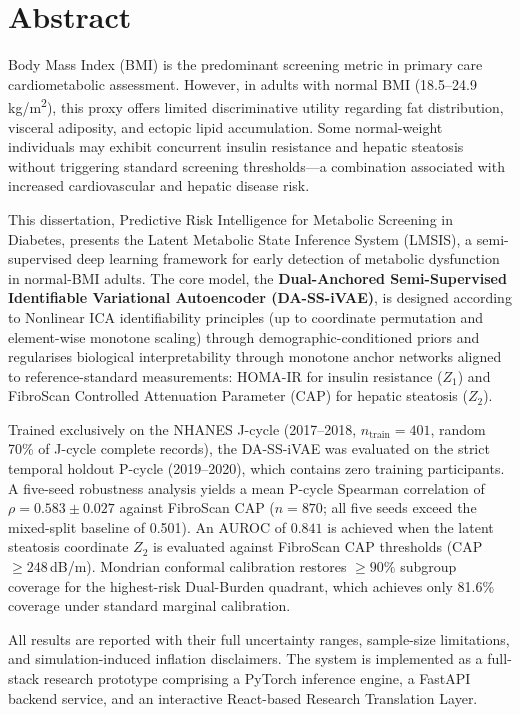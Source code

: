 \documentclass[12pt,a4paper,oneside]{report}
\newcommand{\daivae}{DA-SS-iVAE}
\begin{document}
\chapter*{Abstract}

Body Mass Index (BMI) is the predominant screening metric in primary care cardiometabolic assessment. However, in adults with normal BMI (18.5--24.9\,kg/m\textsuperscript{2}), this proxy offers limited discriminative utility regarding fat distribution, visceral adiposity, and ectopic lipid accumulation. Some normal-weight individuals may exhibit concurrent insulin resistance and hepatic steatosis without triggering standard screening thresholds---a combination associated with increased cardiovascular and hepatic disease risk.

This dissertation, Predictive Risk Intelligence for Metabolic Screening in Diabetes, presents the Latent Metabolic State Inference System (LMSIS), a semi-supervised deep learning framework for early detection of metabolic dysfunction in normal-BMI adults. The core model, the \textbf{Dual-Anchored Semi-Supervised Identifiable Variational Autoencoder (\daivae{})}, is designed according to Nonlinear ICA identifiability principles (up to coordinate permutation and element-wise monotone scaling) through demographic-conditioned priors and regularises biological interpretability through monotone anchor networks aligned to reference-standard measurements: HOMA-IR for insulin resistance ($Z_1$) and FibroScan Controlled Attenuation Parameter (CAP) for hepatic steatosis ($Z_2$).

Trained exclusively on the NHANES J-cycle (2017--2018, $n_{\text{train}} = 401$, random 70\% of J-cycle complete records), the DA-SS-iVAE was evaluated on the strict temporal holdout P-cycle (2019--2020), which contains zero training participants. A five-seed robustness analysis yields a mean P-cycle Spearman correlation of $\rho = 0.583 \pm 0.027$ against FibroScan CAP ($n = 870$; all five seeds exceed the mixed-split baseline of 0.501). An AUROC of $0.841$ is achieved when the latent steatosis coordinate $Z_2$ is evaluated against FibroScan CAP thresholds (CAP $\geq 248$\,dB/m). Mondrian conformal calibration restores $\geq 90\%$ subgroup coverage for the highest-risk Dual-Burden quadrant, which achieves only 81.6\% coverage under standard marginal calibration.

All results are reported with their full uncertainty ranges, sample-size limitations, and simulation-induced inflation disclaimers. The system is implemented as a full-stack research prototype comprising a PyTorch inference engine, a FastAPI backend service, and an interactive React-based Research Translation Layer.
\end{document}
